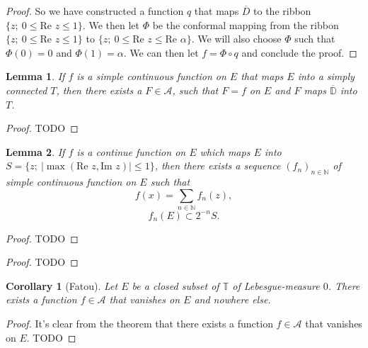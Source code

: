 \documentclass[a4paper,12pt,twoside,BCOR=10mm]{scrbook}
\newtheorem{corollary}{Corollary}
\newtheorem{lemma}{Lemma}
\renewcommand{\Re}{\text{Re }}
\renewcommand{\Im}{\text{Im }}
\begin{document}
\begin{proof}
So we have constructed a function $q$ that maps $\overline{D}$ to the ribbon $\{z;\ 0 \leq \Re z \leq 1\}$.
We then let $\Phi$ be the conformal mapping from the ribbon $\{z;\ 0 \leq \Re z \leq 1\}$ to $\{z;\ 0 \leq \Re z \leq \Re \alpha\}$. %
We will also choose $\Phi$ such that $\Phi(0) = 0$ and $\Phi(1) = \alpha$.
We can then let $f = \Phi \circ q$ and conclude the proof.

\end{proof}
\begin{lemma}
If $f$ is a simple continuous function on $E$ that maps $E$ into a simply connected $T$, then there exists a $F \in \mathcal{A}$, such that $F = f$ on $E$ and $F$ maps $\overline{\mathbb{D}}$ into $T$.
\end{lemma}
\begin{proof}
TODO
\end{proof}
\begin{lemma}
If $f$ is a continue function on $E$ which maps $E$ into $S = \{z;\ |\max(\Re z, \Im z)| \leq 1\}$, then there exists a sequence $(f_n)_{n \in \mathbb{N}}$ of simple continuous function on $E$ such that
\[
	f(x) = \sum_{n \in \mathbb{N}} f_n(z),
\]
\[
	f_n(E) \subset 2^{-n}S.
\]
\end{lemma}
\begin{proof}
TODO
\end{proof}
\begin{proof}
TODO
\end{proof}
\begin{corollary}[Fatou]
Let $E$ be a closed subset of $\mathbb{T}$ of Lebesgue-measure $0$.
There exists a function $f \in \mathcal{A}$ that vanishes on $E$ and nowhere else.
\end{corollary}
\begin{proof}
It's clear from the theorem %
that there exists a function $f \in \mathcal{A}$ that vanishes on $E$.
TODO
\end{proof}
\end{document}
